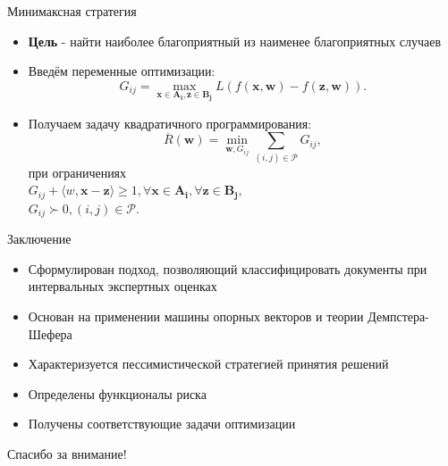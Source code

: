 \documentclass[11pt]{beamer}
\newcommand{\Rho}{%
	\mathcal{P}%
}
\begin{document}
\begin{frame}{Минимаксная стратегия}

\begin{itemize}
	\item \textbf{Цель} - найти наиболее благоприятный из наименее благоприятных случаев
	\item Введём переменные оптимизации:
		\[G_{ij} = \underset{\mathbf{x} \in \mathbf{A_i}, \mathbf{z} \in \mathbf{B_j}}{\operatorname{max}} L (f (\mathbf{x}, \mathbf{w}) - f(\mathbf{z}, \mathbf{w})).\]
	\item Получаем задачу квадратичного программирования:
		\[\overline{R}(\mathbf{w}) = \underset{\mathbf{w}, G_{ij}}{\operatorname{min}} \sum \limits_{(i, j) \in \Rho} G_{ij},\] 
		при ограничениях\\
		\(G_{ij} + \langle w, \mathbf{x} - \mathbf{z} \rangle \geq 1, \forall \mathbf{x} \in \mathbf{A_i}, \forall \mathbf{z} \in \mathbf{B_j}, \) \\
		\(G_{ij} \succ 0, (i, j) \in \Rho\).
\end{itemize}

\end{frame}
\begin{frame}{Заключение}

\begin{itemize}
	\item Сформулирован подход, позволяющий классифицировать документы при интервальных экспертных оценках
	\item Основан на применении машины опорных векторов и теории Демпстера-Шефера
	\item Характеризуется пессимистической стратегией принятия решений
	\item Определены функционалы риска
	\item Получены соответствующие задачи оптимизации
\end{itemize}

\end{frame}
\begin{frame}

\begin{center}
{\Large Спасибо за внимание!}
\end{center}

\end{frame}
\end{document}
